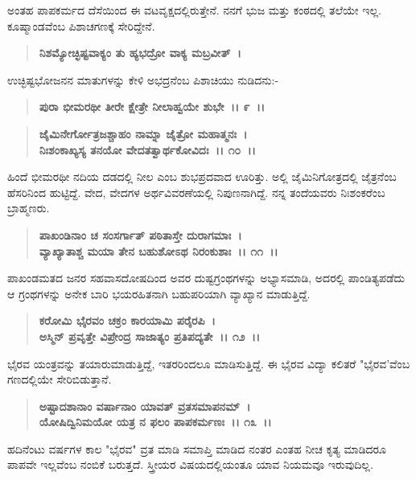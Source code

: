 ಅಂತಹ ಪಾಪಕರ್ಮದ ದೆಸೆಯಿಂದ ಈ ವಟವೃಕ್ಷದಲ್ಲಿರುತ್ತೇನೆ. ನನಗೆ ಭುಜ ಮತ್ತು ಕಂಠದಲ್ಲಿ ತಲೆಯೇ ಇಲ್ಲ. ಕೂಷ್ಮಾಂಡವೆಂಬ ಪಿಶಾಚಗಣಕ್ಕೆ ಸೇರಿದ್ದೇನೆ.

\begin{verse}
\textbf{ನಿಶಮ್ಯೋಚ್ಛಿಷ್ಟವಾಕ್ಯಂ ತು ಹ್ಯಭದ್ರೋ ವಾಕ್ಯ ಮಬ್ರವೀತ್~। }
\end{verse}

ಉಚ್ಛಿಷ್ಟಭೋಜನನ ಮಾತುಗಳನ್ನು ಕೇಳಿ ಅಭದ್ರನೆಂಬ ಪಿಶಾಚಿಯು ನುಡಿದನು:-

\begin{verse}
\textbf{ಪುರಾ ಭೀಮರಥೀ ತೀರೇ ಕ್ಷೇತ್ರೇ ನೀಲಾಹ್ವಯೇ ಶುಭೇ~।। ೯~।।} 
\end{verse}

\begin{verse}
\textbf{ಜೈಮಿನೇರ್ಗೋತ್ರಜಶ್ಚಾಹಂ ನಾಮ್ನಾ ಜೈತ್ರೋ ಮಹಾತ್ಮನಃ~।}\\\textbf{ನಿಃಶಂಕಾಖ್ಯಸ್ಯ ತನಯೋ ವೇದತತ್ವಾರ್ಥಕೋವಿದಃ~।। ೧೦~।।}
\end{verse}

ಹಿಂದೆ ಭೀಮರಥೀ ನದಿಯ ದಡದಲ್ಲಿ ನೀಲ ಎಂಬ ಶುಭಪ್ರದವಾದ ಊರಿತ್ತು. ಅಲ್ಲಿ ಜೈಮಿನಿ\-ಗೋತ್ರದಲ್ಲಿ ಜೈತ್ರನೆಂಬ ಹೆಸರಿನಿಂದ ಹುಟ್ಟಿದ್ದೆ. ವೇದ, ವೇದಗಳ ಅರ್ಥವಿವರಣೆಯಲ್ಲಿ ನಿಪುಣನಾಗಿದ್ದೆ. ನನ್ನ ತಂದೆಯವರು ನಿಃಶಂಕರೆಂಬ ಬ್ರಾಹ್ಮಣರು.

\begin{verse}
\textbf{ಪಾಖಂಡಿನಾಂ ಚ ಸಂಸರ್ಗಾತ್ ಪಠಿತಾಸ್ತೇ ದುರಾಗಮಾಃ~।}\\\textbf{ವ್ಯಾಖ್ಯಾತಾಶ್ಚ ಮಯಾ ತೇನ ಬಹುಶೋಽಥ ನಿರಂಕುಶಾಃ~।। ೧೧~।।}
\end{verse}

ಪಾಖಂಡಮತದ ಜನರ ಸಹವಾಸದೋಷದಿಂದ ಅವರ ದುಷ್ಟಗ್ರಂಥಗಳನ್ನು ಅಭ್ಯಾಸಮಾಡಿ, ಅದರಲ್ಲಿ ಪಾಂಡಿತ್ಯಪಡೆದು ಆ ಗ್ರಂಥಗಳನ್ನು ಅನೇಕ ಬಾರಿ ಭಯರಹಿತನಾಗಿ ಬಹುಪರಿಯಾಗಿ ವ್ಯಾಖ್ಯಾನ ಮಾಡುತ್ತಿದ್ದೆ.

\begin{verse}
\textbf{ಕರೋಮಿ ಭೈರವಂ ಚಕ್ರಂ ಕಾರಯಾಮಿ ಪರೈರಪಿ~।}\\\textbf{ಅಸ್ಮಿನ್ ಪ್ರವೃತ್ತೇ ವಿಪ್ರೇಂದ್ರ ಸಾಜಾತ್ಯಂ ಪ್ರತಿಪದ್ಯತೇ~।। ೧೨~।।}
\end{verse}

ಭೈರವ ಯಂತ್ರವನ್ನು ತಯಾರುಮಾಡುತ್ತಿದ್ದೆ, ಇತರರಿಂದಲೂ ಮಾಡಿಸುತ್ತಿದ್ದೆ. ಈ ಭೈರವ ವಿದ್ಯಾ ಕಲಿತರೆ "ಭೈರವ'ವೆಂಬ ಗಣದಲ್ಲಿಯೇ ಸೇರಿಬಿಡುತ್ತಾನೆ.

\begin{verse}
\textbf{ಅಷ್ಟಾದಶಾನಾಂ ವರ್ಷಾನಾಂ ಯಾವತ್‌ ವ್ರತಸಮಾಪನಮ್~।}\\\textbf{ಯೋಷಿದ್ವಿನಿಮಯೋ ಯತ್ರ ನ ಫಲಂ ಪಾಪಕರ್ಮಣಃ~।। ೧೩~।।}
\end{verse}

ಹದಿನೆಂಟು ವರ್ಷಗಳ ಕಾಲ "ಭೈರವ" ವ್ರತ ಮಾಡಿ ಸಮಾಪ್ತಿ ಮಾಡಿದ ನಂತರ ಎಂತಹ ನೀಚ ಕೃತ್ಯ ಮಾಡಿದರೂ ಪಾಪವೇ ಇಲ್ಲವೆಂಬ ನಂಬಿಕೆ ಬರುತ್ತದೆ. ಸ್ತ್ರೀಯರ ವಿಷಯದಲ್ಲಿಯಂತೂ ಯಾವ ನಿಯಮವೂ ಇರುವುದಿಲ್ಲ.

